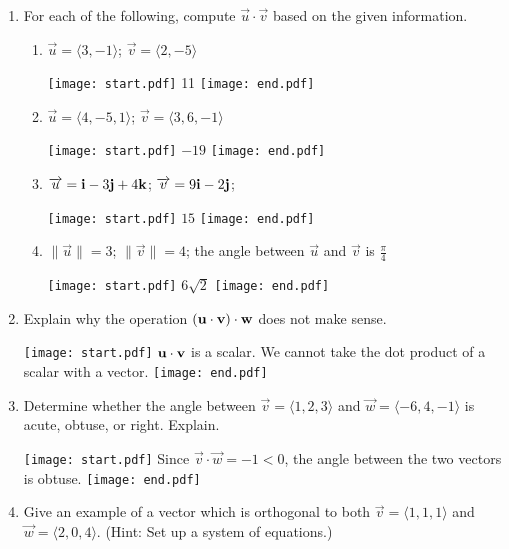 \documentclass[12pt]{article}
\begin{document}
\begin{enumerate}

\item For each of the following, compute $\overrightarrow{u}\cdot\overrightarrow{v}$ based on the given information.

\begin{enumerate}

\item $\overrightarrow{u}=\langle 3,-1 \rangle$; $\overrightarrow{v}=\langle 2,-5 \rangle$

\texttt{[image: start.pdf]}
{{11}}
\texttt{[image: end.pdf]}


\item $\overrightarrow{u}=\langle 4,-5,1 \rangle$; $\overrightarrow{v}=\langle 3,6,-1 \rangle$

\texttt{[image: start.pdf]}
{{$-19$}}
\texttt{[image: end.pdf]}


\item $\overrightarrow{u}={\bf i}-3{\bf j}+4{\bf k}$; $\overrightarrow{v}=9{\bf i}-2{\bf j}$;

\texttt{[image: start.pdf]}
{{$15$}}
\texttt{[image: end.pdf]}


\item $\|\overrightarrow{u}\|=3$; $\|\overrightarrow{v}\|=4$; the angle between $\overrightarrow{u}$ and $\overrightarrow{v}$ is $\frac{\pi}{4}$

\texttt{[image: start.pdf]}
{{$6\sqrt{2}$}}
\texttt{[image: end.pdf]}


\end{enumerate}

\item Explain why the operation $({\bf u}\cdot{\bf v})\cdot{\bf w}$ does not make sense.

\texttt{[image: start.pdf]}
{{${\bf u}\cdot {\bf v}$ is a scalar.  We cannot take the dot product of a scalar with a vector.}}
\texttt{[image: end.pdf]}


\item Determine whether the angle between $\overrightarrow{v}=\langle 1,2,3 \rangle$ and $\overrightarrow{w}=\langle -6,4,-1\rangle$ is acute, obtuse, or right.  Explain.

\texttt{[image: start.pdf]}
{{Since $\overrightarrow{v}\cdot\overrightarrow{w}=-1<0$, the angle between the two vectors is obtuse.}}
\texttt{[image: end.pdf]}


\item Give an example of a vector which is orthogonal to both $\overrightarrow{v}=\langle 1,1,1\rangle$ and $\overrightarrow{w}=\langle 2,0,4 \rangle$.  (Hint: Set up a system of equations.)


\end{enumerate}
\end{document}
